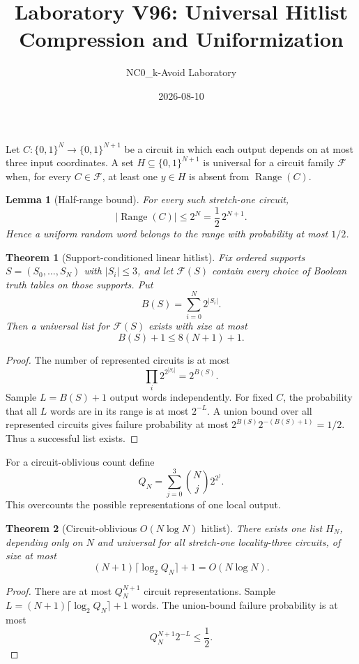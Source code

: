 \documentclass[11pt]{article}
\title{Laboratory V96: Universal Hitlist Compression and Uniformization}
\author{NC0\_k-Avoid Laboratory}
\date{2026-08-10}
\newtheorem{theorem}{Theorem}
\newtheorem{lemma}{Lemma}
\newcommand{\bits}{\{0,1\}}
\begin{document}
\maketitle

Let $C:\bits^N\to\bits^{N+1}$ be a circuit in which each output depends on at
most three input coordinates.  A set $H\subseteq\bits^{N+1}$ is universal for a
circuit family $\mathcal F$ when, for every $C\in\mathcal F$, at least one
$y\in H$ is absent from $\operatorname{Range}(C)$.

\begin{lemma}[Half-range bound]
For every such stretch-one circuit,
\[
 |\operatorname{Range}(C)|\le 2^N=\frac12\,2^{N+1}.
\]
Hence a uniform random word belongs to the range with probability at most
$1/2$.
\end{lemma}

\begin{theorem}[Support-conditioned linear hitlist]
Fix ordered supports $S=(S_0,\ldots,S_N)$ with $|S_i|\le3$, and let
$\mathcal F(S)$ contain every choice of Boolean truth tables on those supports.
Put
\[
 B(S)=\sum_{i=0}^{N}2^{|S_i|}.
\]
Then a universal list for $\mathcal F(S)$ exists with size at most
\[
 B(S)+1\le 8(N+1)+1.
\]
\end{theorem}

\begin{proof}
The number of represented circuits is at most
\[
 \prod_i 2^{2^{|S_i|}}=2^{B(S)}.
\]
Sample $L=B(S)+1$ output words independently.  For fixed $C$, the probability
that all $L$ words are in its range is at most $2^{-L}$.  A union bound over all
represented circuits gives failure probability at most
$2^{B(S)}2^{-(B(S)+1)}=1/2$.  Thus a successful list exists.
\end{proof}

For a circuit-oblivious count define
\[
 Q_N=\sum_{j=0}^{3}\binom Nj 2^{2^j}.
\]
This overcounts the possible representations of one local output.

\begin{theorem}[Circuit-oblivious $O(N\log N)$ hitlist]
There exists one list $H_N$, depending only on $N$ and universal for all
stretch-one locality-three circuits, of size at most
\[
 (N+1)\lceil\log_2 Q_N\rceil+1=O(N\log N).
\]
\end{theorem}

\begin{proof}
There are at most $Q_N^{N+1}$ circuit representations.  Sample
$L=(N+1)\lceil\log_2Q_N\rceil+1$ words.  The union-bound failure probability is
at most
\[
 Q_N^{N+1}2^{-L}\le\frac12.
\]
\end{proof}
\end{document}

